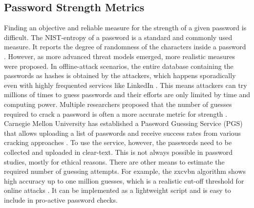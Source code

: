 \subsection{Password Strength Metrics}
Finding an objective and reliable measure for the strength of a given password is difficult. The NIST-entropy of a password is a standard and commonly used measure. It reports the degree of randomness of the characters inside a password \cite[ Appendix A therein]{Burr2011NIST}. However, as more advanced threat models emerged, more realistic measures were proposed. In offline-attack scenarios, the entire database containing the passwords as hashes is obtained by the attackers, which happens sporadically even with highly frequented services like LinkedIn \cite{Florencio2007DoStrongWebPasswords,Scott2016ProtectingLinkedIn,Shay2016DesigningPasswordPolicies}. This means attackers can try millions of times to guess passwords and their efforts are only limited by time and computing power. Multiple researchers proposed that the number of guesses required to crack a password is often a more accurate metric for strength \cite{Kelley20012GuessAgain, Shay2016DesigningPasswordPolicies, Weir2010MetricsPolicies}. Carnegie Mellon University has established a Password Guessing Service (PGS) that allows uploading a list of passwords and receive success rates from various cracking approaches \cite{Ur2015MeasuringRealWorldAccuracies}. To use the service, however, the passwords need to be collected and uploaded in clear-text. This is not always possible in password studies, mostly for ethical reasons. There are other means to estimate the required number of guessing attempts. For example, the zxcvbn algorithm shows high accuracy up to one million guesses, which is a realistic cut-off threshold for online attacks \cite{Wheeler2016zxcvbn}. It can be implemented as a lightweight script and is easy to include in pro-active password checks.


